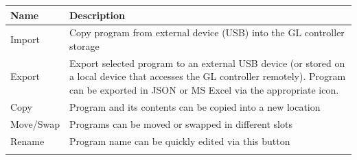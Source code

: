 \documentclass{article}
\begin{document}
\begin{longtable}[]{@{}|l|l|@{}}
\toprule
\rowcolor{magenta}\begin{minipage}[b]{0.20\columnwidth}\raggedright
{\bf{Name}}\strut
\end{minipage} & \begin{minipage}[b]{0.74\columnwidth}\raggedright
{\bf{Description}}\strut
\end{minipage}\tabularnewline
\midrule
\endhead
\begin{minipage}[t]{0.20\columnwidth}\raggedright
Import\strut
\end{minipage} & \begin{minipage}[t]{0.74\columnwidth}\raggedright
Copy program from external device (USB) into the GL controller
storage\strut
\end{minipage}\tabularnewline
\begin{minipage}[t]{0.20\columnwidth}\raggedright
Export\strut
\end{minipage} & \begin{minipage}[t]{0.74\columnwidth}\raggedright
Export selected program to an external USB device (or stored on a local
device that accesses the GL controller remotely). Program can be
exported in JSON or MS Excel via the appropriate icon.\strut
\end{minipage}\tabularnewline
\begin{minipage}[t]{0.20\columnwidth}\raggedright
Copy\strut
\end{minipage} & \begin{minipage}[t]{0.74\columnwidth}\raggedright
Program and its contents can be copied into a new location\strut
\end{minipage}\tabularnewline
\begin{minipage}[t]{0.20\columnwidth}\raggedright
Move/Swap\strut
\end{minipage} & \begin{minipage}[t]{0.74\columnwidth}\raggedright
Programs can be moved or swapped in different slots\strut
\end{minipage}\tabularnewline
\begin{minipage}[t]{0.20\columnwidth}\raggedright
Rename\strut
\end{minipage} & \begin{minipage}[t]{0.74\columnwidth}\raggedright
Program name can be quickly edited via this button\strut
\end{minipage}\tabularnewline
\begin{minipage}[t]{0.20\columnwidth}\raggedright

\end{minipage}
\end{longtable}
\end{document}
